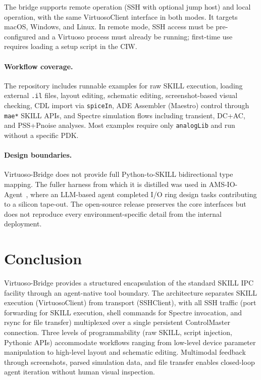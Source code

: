 \documentclass[lettersize,journal]{ieee_template/IEEEtran}
\begin{document}
The bridge supports remote operation (SSH with optional jump host) and local operation, with the same VirtuosoClient interface in both modes. It targets macOS, Windows, and Linux. In remote mode, SSH access must be pre-configured and a Virtuoso process must already be running; first-time use requires loading a setup script in the CIW.

\paragraph{Workflow coverage.} The repository includes runnable examples for raw SKILL execution, loading external \texttt{.il} files, layout editing, schematic editing, screenshot-based visual checking, CDL import via \texttt{spiceIn}, ADE Assembler (Maestro) control through \texttt{mae*} SKILL APIs, and Spectre simulation flows including transient, DC+AC, and PSS+Pnoise analyses. Most examples require only \texttt{analogLib} and run without a specific PDK.

\paragraph{Design boundaries.} Virtuoso-Bridge does not provide full Python-to-SKILL bidirectional type mapping. The fuller harness from which it is distilled was used in AMS-IO-Agent~\cite{amsioagent}, where an LLM-based agent completed I/O ring design tasks contributing to a silicon tape-out. The open-source release preserves the core interfaces but does not reproduce every environment-specific detail from the internal deployment.

\section{Conclusion}

Virtuoso-Bridge provides a structured encapsulation of the standard SKILL IPC facility through an agent-native tool boundary. The architecture separates SKILL execution (VirtuosoClient) from transport (SSHClient), with all SSH traffic (port forwarding for SKILL execution, shell commands for Spectre invocation, and rsync for file transfer) multiplexed over a single persistent ControlMaster connection. Three levels of programmability (raw SKILL, script injection, Pythonic APIs) accommodate workflows ranging from low-level device parameter manipulation to high-level layout and schematic editing. Multimodal feedback through screenshots, parsed simulation data, and file transfer enables closed-loop agent iteration without human visual inspection.
\end{document}
